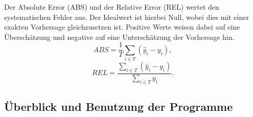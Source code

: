 %
%
Der Absolute Error (\gls{ABS}) und der Relative Error (\gls{REL}) wertet den systematischen Fehler aus. Der Idealwert ist hierbei Null, wobei dies mit einer exakten Vorhersage gleichzusetzen ist. Positive Werte weisen dabei auf eine Überschätzung und negative auf eine Unterschätzung der Vorhersage hin.\,
%
\begin{equation}
ABS= \frac{1}{T} \sum\limits_{i \in T} (\hat{y}_i-y_i),
\label{gl:ABS}
\end{equation}
%
%
\begin{equation}
REL= \frac{\sum_{i \in T} (\hat{y}_i-y_i)}{\sum_{i \in T} y_i} .
\label{gl:REL}
\end{equation}



%        

%        

%        


\newpage
\subsection{Überblick und Benutzung der Programme}\label{sec:program}

